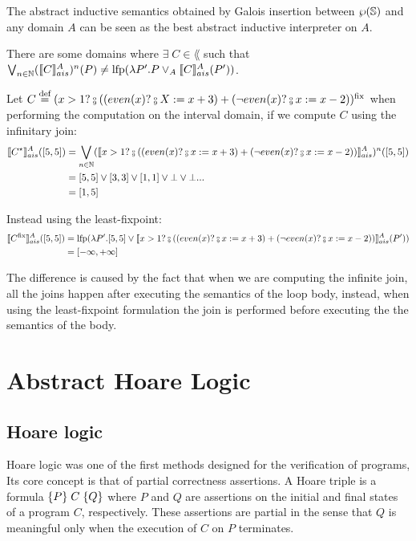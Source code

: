 \documentclass[
  10pt,       %
  twoside,    %
  a4paper,    %
  english,    %
  tikz,       %
  openright,  %
]{book}
\begin{document}
The abstract inductive semantics obtained by Galois insertion between 
$\wp(\mathbb{S})$ and any domain $A$ can be seen as the best abstract inductive 
interpreter on $A$.

\begin{observation}
  \label{obs:abstract-fix}
  There are some domains where $\exists \; C \in \lang$ such that
  $\bigvee_{n \in \mathbb{N}} (\llbracket C \rrbracket_{ais}^{A})^n(P) \neq \mathrm{lfp}(\lambda P'. P \lor_A
  \llbracket C \rrbracket_{ais}^{A}(P'))$.
\end{observation}
\begin{example}
  Let $C \defeq (x > 1? \fcmp ((even(x) ? \fcmp X := x + 3) +
  (\neg even(x)? \fcmp x := x - 2))^\fix$ when performing the computation on
  the interval domain, if we compute $C$ using the infinitary join:
  \begin{align*}
    \asem{C^\star}([5, 5])
      &= \bigvee_{n \in \mathbb{N}} (\asem{x > 1? \fcmp ((even(x) ? \fcmp x :=
        x + 3) + (\neg even(x)? \fcmp x := x - 2))})^n([5, 5]) \\
      &= [5, 5] \join [3, 3] \join [1, 1] \join \bot \join \bot ... \\
      &= [1, 5]
  \end{align*}

  Instead using the least-fixpoint:
  \begin{align*}
    \asem{C^\fix}([5, 5])
      &= \lfp(\lambda P' . [5, 5] \join \asem{x > 1? \fcmp ((even(x) ? \fcmp x :=
        x + 3) + (\neg even(x)? \fcmp x := x - 2))}(P')) \\
      &= [-\infty, +\infty]
\end{align*}

  The difference is caused by the fact that when we are computing the infinite 
  join, all the joins happen after executing the semantics of the loop body, 
  instead, when using the least-fixpoint formulation the join is performed 
  before executing the the semantics of the body.
  
\end{example}
\section{Abstract Hoare Logic}
\label{chp:intro-ahorare}

\subsection{Hoare logic}
Hoare logic  \cite{Hoare69, Floyd93} was one of the first methods designed for 
the verification of programs, Its core concept is that of partial correctness 
assertions. A Hoare triple is a formula $\{ P \} \; C \; \{ Q \}$ where $P$ and $Q$ are 
assertions on the initial and final states of a program $C$, respectively. 
These assertions are partial in the sense that $Q$ is meaningful only when the 
execution of $C$ on $P$ terminates.
\end{document}
